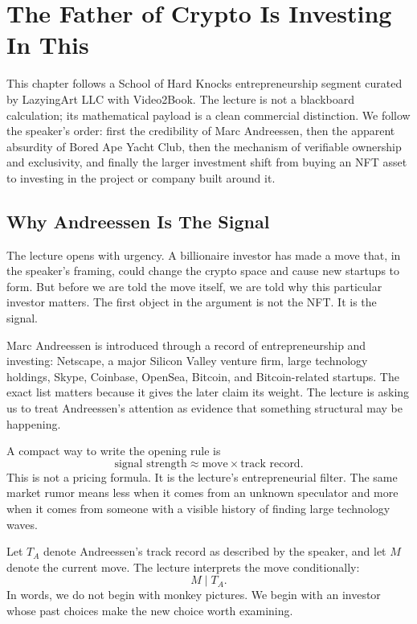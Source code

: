 \chapter{The Father of Crypto Is Investing In This}

This chapter follows a School of Hard Knocks entrepreneurship segment curated by LazyingArt LLC with Video2Book. The lecture is not a blackboard calculation; its mathematical payload is a clean commercial distinction. We follow the speaker's order: first the credibility of Marc Andreessen, then the apparent absurdity of Bored Ape Yacht Club, then the mechanism of verifiable ownership and exclusivity, and finally the larger investment shift from buying an NFT asset to investing in the project or company built around it.

\section{Why Andreessen Is The Signal}

The lecture opens with urgency. A billionaire investor has made a move that, in the speaker's framing, could change the crypto space and cause new startups to form. But before we are told the move itself, we are told why this particular investor matters. The first object in the argument is not the NFT. It is the signal.

Marc Andreessen is introduced through a record of entrepreneurship and investing: Netscape, a major Silicon Valley venture firm, large technology holdings, Skype, Coinbase, OpenSea, Bitcoin, and Bitcoin-related startups. The exact list matters because it gives the later claim its weight. The lecture is asking us to treat Andreessen's attention as evidence that something structural may be happening.

A compact way to write the opening rule is
\begin{equation}
\text{signal strength}
\approx
\text{move} \times \text{track record}.
\end{equation}
This is not a pricing formula. It is the lecture's entrepreneurial filter. The same market rumor means less when it comes from an unknown speculator and more when it comes from someone with a visible history of finding large technology waves.

Let \(T_A\) denote Andreessen's track record as described by the speaker, and let \(M\) denote the current move. The lecture interprets the move conditionally:
\begin{equation}
M \mid T_A.
\end{equation}
In words, we do not begin with monkey pictures. We begin with an investor whose past choices make the new choice worth examining.

